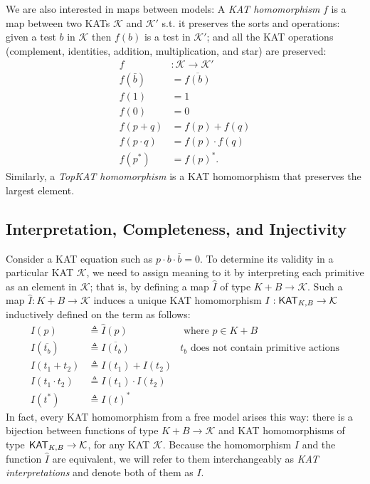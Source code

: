 We are also interested in maps between models:
A \emph{KAT homomorphism} \(f\) is a map between two KATs \(\mathcal{K}\) and \(\mathcal{K}'\)
s.t. it preserves the sorts and operations:
given a test \(b\) in \(\mathcal{K}\) then \(f(b)\) is a test in \(\mathcal{K}'\);
and all the KAT operations (complement, identities, addition, multiplication, and star) are preserved:
\begin{align*}
    f & : \mathcal{K}  \to  \mathcal{K}'\\
    f(\bar{b}) & = \overline{f(b)} \\  
    f(1) & = 1 \\  
    f(0) & = 0 \\
    f(p + q) & = f(p) + f(q) \\  
    f(p  \cdot  q) & = f(p)  \cdot  f(q) \\  
    f(p^*) & = f(p)^*.
\end{align*}
Similarly, a \emph{TopKAT homomorphism} is a KAT homomorphism that preserves the
largest element.

\subsection{Interpretation, Completeness, and Injectivity}\label{sec: completeness background}

Consider a KAT equation such as \(p  \cdot  b  \cdot  \bar{b} = 0\). To determine its
validity in a particular KAT \(\mathcal{K}\), we need to assign meaning to it by
interpreting each primitive as an element in \(\mathcal{K}\); that is, by defining a map
\(\hat{I}\) of type \(K + B  \to  \mathcal{K}\).  Such a map \(\hat{I}: K + B  \to  \mathcal{K}\) induces a
unique KAT homomorphism \(I : \mathsf{KAT}_{K,B}  \to  \mathcal{K}\) inductively defined on the term 
as follows:
\begin{equation}
    \begin{aligned}
        I(p)       &  \triangleq  \hat{I}(p)    & \text{ where } p  \in  K + B \\
        I(\overline{t_b}) &  \triangleq  \overline{I(t_b)} 
            & \text{\(t_b\) does not contain primitive actions} \\
        I(t_{1} + t_{2}) &  \triangleq  I(t_{1}) + I(t_{2})                     \\
        I(t_{1}  \cdot  t_{2}) &  \triangleq  I(t_{1})  \cdot  I(t_{2})                     \\
        I(t^*)     &  \triangleq  I(t)^*
    \end{aligned}
\end{equation}
In fact, every KAT homomorphism from a free model arises this way: there is a
bijection between functions of type \(K + B  \to  \mathcal{K}\) and KAT homomorphisms of type
\(\mathsf{KAT}_{K, B}  \to  \mathcal{K}\), for any KAT \(\mathcal{K}\).  
Because the homomorphism \(I\) and the function \(\hat{I}\) are equivalent, 
we will refer to them interchangeably as \emph{KAT interpretations} 
and denote both of them as \(I\).


